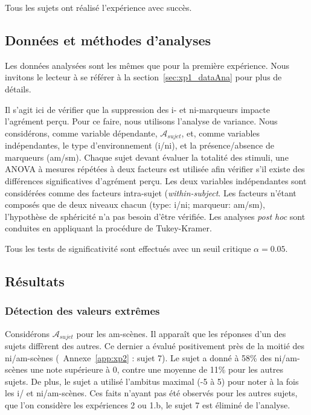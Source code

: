 \documentclass[twoside,twocolumn]{article}
\begin{document}
Tous les sujets ont réalisé l'expérience avec succès.

\subsection{Données et méthodes d'analyses}

Les données analysées sont les mêmes que pour la première expérience. Nous invitons le lecteur à se référer à la section~\ref{sec:xp1_dataAna} pour plus de détails.

Il s'agit ici de vérifier que la suppression des i- et ni-marqueurs impacte l'agrément perçu. Pour ce faire, nous utilisons l'analyse de variance. Nous considérons, comme variable dépendante, $\mathcal{A}_{sujet}$, et, comme variables indépendantes, le type d'environnement (i/ni), et la présence/absence de marqueurs (am/sm). Chaque sujet devant évaluer la totalité des stimuli, une ANOVA à mesures répétées à deux facteurs est utilisée afin vérifier s'il existe des différences significatives d'agrément perçu. Les deux variables indépendantes sont considérées comme des facteurs intra-sujet (\emph{within-subject}. Les facteurs n'étant composés que de deux niveaux chacun (type: i/ni; marqueur: am/sm), l'hypothèse de sphéricité n'a pas besoin d'être vérifiée. Les analyses \emph{post hoc} sont conduites en appliquant la procédure de Tukey-Kramer.

Tous les tests de significativité sont effectués avec un seuil critique $\alpha=0.05$.

\subsection{Résultats}

\subsubsection{Détection des valeurs extrêmes}

Considérons $\mathcal{A}_{sujet}$ pour les am-scènes. Il apparaît que les réponses d'un des sujets diffèrent des autres. Ce dernier a évalué positivement près de la moitié des ni/am-scènes (\cf~Annexe~\ref{app:xp2} : sujet 7). Le sujet a donné à 58\% des ni/am-scènes une note supérieure à 0, contre une moyenne de 11\% pour les autres sujets. De plus, le sujet a utilisé l'ambitus maximal (-5 à 5) pour noter à la fois les i/ et ni/am-scènes. Ces faits n'ayant pas été observés pour les autres sujets, que l'on considère les expériences 2 ou 1.b, le sujet 7 est éliminé de l'analyse.
\end{document}
